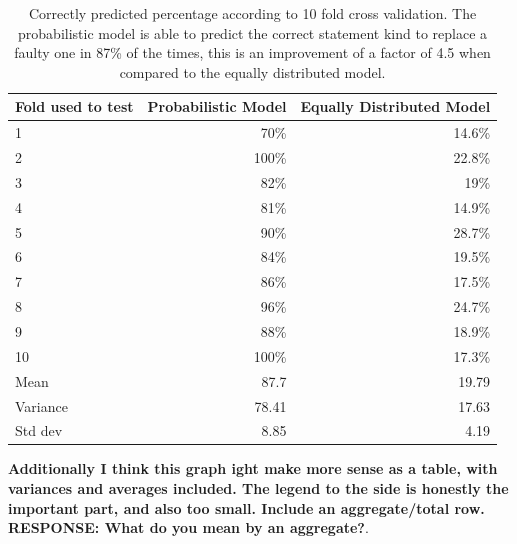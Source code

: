 \documentclass[conference]{IEEEtran}
\newcommand{\todo}[1]
  {{\scriptsize \textbf{\color{red} {#1}}}}
\begin{document}


\begin{table}[ht]
\begin{tabular}{lrr}
Fold used to test	&Probabilistic Model&	Equally Distributed Model\\
	\hline
1	&70\%&	14.6\%\\
2	&100\%&	22.8\%\\
3	&82\%	&19\%\\
4	&81\%	&14.9\%\\
5	&90\%	&28.7\%\\
6	&84\%	&19.5\%\\
7	&86\%	&17.5\%\\
8	&96\%	&24.7\%\\
9	&88\%	&18.9\%\\
10	&100\%	&17.3\%\\
	\hline
Mean	&87.7	&19.79\\
	\hline
Variance	&78.41&	17.63\\
	\hline
Std dev	&8.85&	4.19\\
\hline
\end{tabular}
\center
  \caption{Correctly predicted percentage according to 10 fold cross
    validation. The probabilistic model is able to predict the correct statement kind to replace a faulty one in 87\% of the times, this is an improvement of a factor of 4.5 when compared to the equally distributed model.}
  \label{fig:results10fcv}
\end{table} 


\todo{Additionally I think this graph ight make more
      sense as a table, with variances and averages included.  The legend to the
      side is honestly the important part, and also too small.  Include an
      aggregate/total row. RESPONSE: What do you mean by an aggregate?}. 
\end{document}
